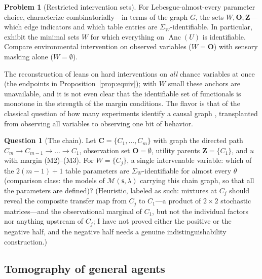 \documentclass[11pt]{amsart}
\theoremstyle{plain}
\theoremstyle{definition}
\newtheorem{problem}[theorem]{Problem}
\newtheorem{question}[theorem]{Question}
\DeclareMathOperator{\Anc}{Anc}
\newcommand{\bC}{\mathbf{C}}
\newcommand{\bO}{\mathbf{O}}
\newcommand{\bZ}{\mathbf{Z}}
\newcommand{\MM}{\mathcal{M}}
\newcommand{\sk}{\mathsf{s}}
\begin{document}
\begin{problem}[Restricted intervention sets]\label{prob:restricted}
For Lebesgue-almost-every parameter choice, characterize combinatorially---in terms of the graph $G$, the sets $W,\bO,\bZ$---which edge indicators and which table entries are $\Sigma_W$-identifiable. In particular, exhibit the minimal sets $W$ for which everything on $\Anc(U)$ is identifiable. Compare environmental intervention on observed variables ($W=\bO$) with sensory masking alone ($W=\emptyset$).
\end{problem}

The reconstruction of \cite{richens2024} leans on hard interventions on \emph{all} chance variables at once (the endpoints in Proposition~\ref{prop:equiv}); with $W$ small these anchors are unavailable, and it is not even clear that the identifiable set of functionals is monotone in the strength of the margin conditions. The flavor is that of the classical question of how many experiments identify a causal graph \cite{eberhardt2005}, transplanted from observing all variables to observing one bit of behavior.

\begin{question}[The chain]\label{q:chain}
Let $\bC=\{C_1,\dots,C_m\}$ with graph the directed path $C_m\to C_{m-1}\to\dots\to C_1$, observation set $\bO=\emptyset$, utility parents $\bZ=\{C_1\}$, and $u$ with margin (M2)--(M3). For $W=\{C_j\}$, a single intervenable variable: which of the $2(m-1)+1$ table parameters are $\Sigma_W$-identifiable for almost every $\theta$ (comparison class: the models of $\MM(\sk,\lambda)$ carrying this chain graph, so that all the parameters are defined)? (Heuristic, labeled as such: mixtures at $C_j$ should reveal the composite transfer map from $C_j$ to $C_1$---a product of $2\times2$ stochastic matrices---and the observational marginal of $C_1$, but not the individual factors nor anything upstream of $C_j$; I have not proved either the positive or the negative half, and the negative half needs a genuine indistinguishability construction.)
\end{question}

\subsection{Tomography of general agents}
\end{document}
